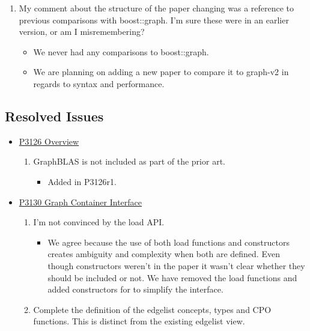 \begin{itemize}
            \begin{enumerate}
                  \item My comment about the structure of the paper changing was a reference to previous comparisons with boost::graph. 
                        I'm sure these were in an earlier version, or am I misremembering?
                  \begin{itemize}
                        \item We never had any comparisons to boost::graph. 
                        \item We are planning on adding a new paper to compare it to graph-v2 in regards to syntax and performance.
                  \end{itemize}
            \end{enumerate}
\end{itemize}

\subsection{Resolved Issues}
\begin{itemize}
      \item \href{https://www.wg21.link/P3126}{P3126 Overview}
            \begin{enumerate}
                  \item GraphBLAS is not included as part of the prior art.
                        \begin{itemize}
                              \item Added in P3126r1.
                        \end{itemize}
            \end{enumerate}
      \item \href{https://www.wg21.link/P3130}{P3130 Graph Container Interface}
            \begin{enumerate}
                  \item I'm not convinced by the load API.
                        \begin{itemize}
                              \item We agree because the use of both load functions and constructors creates ambiguity and complexity when both are defined.
                                    Even though constructors weren't in the paper it wasn't clear whether they should be included or not.
                                    We have removed the load functions and added constructors for  to simplify the interface.
                        \end{itemize}
                        \item Complete the definition of the edgelist concepts, types and CPO functions. This is distinct from the existing edgelist view.
                  \end{enumerate}
\end{itemize}
